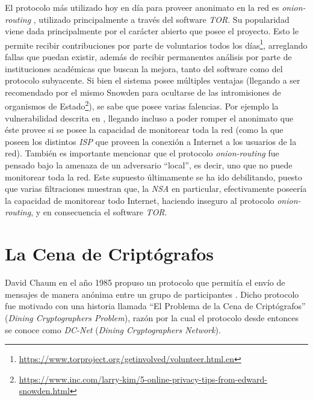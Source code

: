 El protocolo más utilizado hoy en día para proveer anonimato en la red es 
\emph{onion-routing} \cite{reed1998anonymous}, utilizado principalmente a 
través del software \emph{TOR}. Su popularidad viene dada principalmente por 
el carácter abierto que posee el proyecto. Esto le permite recibir 
contribuciones por parte de voluntarios todos los 
días\footnote{\url{https://www.torproject.org/getinvolved/volunteer.html.en}}, 
arreglando fallas que puedan existir, además de recibir permanentes análisis 
por parte de instituciones académicas que buscan la mejora, tanto del software 
como del protocolo subyacente. Si bien el sistema posee múltiples ventajas 
(llegando a ser recomendado por el mismo Snowden para ocultarse de las 
intromisiones de organismos de 
Estado\footnote{\url{https://www.inc.com/larry-kim/5-online-privacy-tips-from-edward-snowden.html}}), se sabe que posee 
varias falencias. Por ejemplo la vulnerabilidad descrita en 
\cite{syverson2001towards}, llegando incluso a poder romper el anonimato que 
éste provee si se posee la capacidad de monitorear toda la red (como la que 
poseen los distintos \emph{ISP} que proveen la conexión a Internet a los 
usuarios de la red). También es importante mencionar que el protocolo 
\emph{onion-routing} fue pensado bajo la amenaza de un adversario ``local'', 
es decir, uno que no puede monitorear toda la red. Este supuesto últimamente 
se ha ido debilitando, puesto que varias filtraciones muestran que, la 
\emph{NSA} en particular, efectivamente poseería la capacidad de monitorear 
todo Internet, haciendo inseguro al protocolo \emph{onion-routing}, y en 
consecuencia el software \emph{TOR}.

\section{La Cena de Criptógrafos}

David Chaum en el año 1985 propuso un protocolo que permitía el envío de 
mensajes de manera anónima entre un grupo de participantes 
\cite{Chaum:1985:SWI:4372.4373, chaum1988dining}. Dicho protocolo fue motivado 
con una historia llamada ``El Problema de la Cena de Criptógrafos'' 
(\emph{Dining Cryptographers Problem}), razón por la cual el protocolo desde 
entonces se conoce como \emph{DC-Net} (\emph{Dining Cryptographers Network}).

